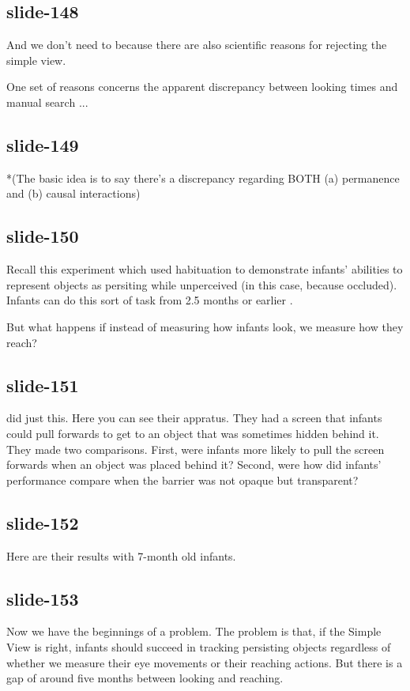 \documentclass[12pt,\papersize]{extarticle}
\begin{document}
\subsection{slide-148}
And we don't need to because there are also scientific reasons for rejecting the simple view.
 
One set of reasons concerns the apparent discrepancy between looking times and manual search ...
 
\subsection{slide-149}
*(The basic idea is to say there's a discrepancy regarding BOTH (a) permanence and (b) 
causal interactions)
 
\subsection{slide-150}
Recall this experiment which used habituation to demonstrate infants' abilities to represent
objects as persiting while unperceived (in this case, because occluded).
Infants can do this sort of task from 2.5 months or earlier \citep{Aguiar:1999jq}.
 
But what happens if instead of measuring how infants look, we measure how they reach?
 
\subsection{slide-151}
\citet{Shinskey:2001fk} did just this.
Here you can see their appratus.
They had a screen that infants could pull forwards to get to an object that was sometimes
hidden behind it.
They made two comparisons.
First, were infants more likely to pull the screen forwards when an object was placed behind it?
Second, were how did infants' performance compare when the barrier was not opaque but transparent?
 
\subsection{slide-152}
Here are their results with 7-month old infants.
 
\subsection{slide-153}
Now we have the beginnings of a problem.
The problem is that, if the Simple View is right, infants should succeed in tracking persisting
objects regardless of whether we measure their eye movements or their reaching actions.
But there is a gap of around five months between looking and reaching.
 
\end{document}
